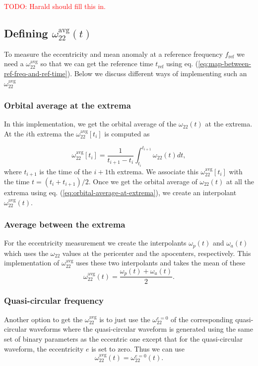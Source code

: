 \documentclass[aps,prd,amsmath,floats,floatfix, twocolumn,
superscriptaddress,nofootinbib,showpacs]{revtex4-1}
\newcommand{\red}{\textcolor{red}}
\newcommand{\TODO}[1]{\red{TODO: #1}}
\newcommand{\avgOmega}{\omega^{\text{avg}}_{22}}
\newcommand{\zeroOmega}{\omega_{22}^{e=0}}
\newcommand{\tref}{t_{\text{ref}}}
\newcommand{\fref}{f_{\text{ref}}}
\begin{document}
\TODO{Harald should fill this in.}

\subsection{Defining $\avgOmega(t)$}
\label{sec:definig-average-omega22}

To measure the eccentricity and mean anomaly at a reference frequency $\fref$
we need a $\avgOmega$ so that we can get the reference
time $\tref$ using
eq. (\ref{eq:map-between-ref-freq-and-ref-time}). Below we discuss
different ways of implementing such an $\avgOmega$

\subsubsection{Orbital average at the extrema}
\label{sec:orbital-average-at-the-extrema}
In this implementation, we get the orbital average of the
$\omega_{22}(t)$ at the extrema. At the $i$th extrema the
$\avgOmega[t_i]$ is computed as

\begin{equation}
  \label{eq:orbital-average-at-extrema}
  \avgOmega[t_i] = \frac{1}{t_{i+1} -
    t_{i}}\int_{t_{i}}^{t_{i+1}}\omega_{22}(t) dt,
\end{equation}
where $t_{i+1}$ is the time of the $i+1$th extrema. We associate this
$\avgOmega[t_{i}]$ with the time $t = (t_i +
t_{i+1})/2$. Once we get the orbital average of $\omega_{22}(t)$ at
all the extrema using eq. (\ref{eq:orbital-average-at-extrema}), we
create an interpolant $\avgOmega(t)$.

\subsubsection{Average between the extrema}
\label{sec:average-between-the-extrema}
For the eccentricity measurement we create the interpolants
$\omega_{p}(t)$ and $\omega_a(t)$ which uses the $\omega_{22}$ values
at the pericenter and the apocenters, respectively. This
implementation of $\avgOmega$ uses these two
interpolants and takes the mean of these
\begin{equation}
  \label{eq:average-between-extrema}
  \avgOmega(t) = \frac{\omega_{p}(t) + \omega_{a}(t)}{2}.
\end{equation}

\subsubsection{Quasi-circular frequency}
\label{sec:quasi-circular-frequency}
Another option to get the $\avgOmega$ is to just use
the $\zeroOmega$ of the corresponding quasi-circular waveforms
where the quasi-circular waveform is generated using the same set of
binary parameters as the eccentric one except that for the
quasi-circular waveform, the eccentricity $e$ is set to zero. Thus we
can use
\begin{equation}
  \label{eq:quasi-circular-frequency}
  \avgOmega(t) = \zeroOmega(t).
\end{equation}
\end{document}
